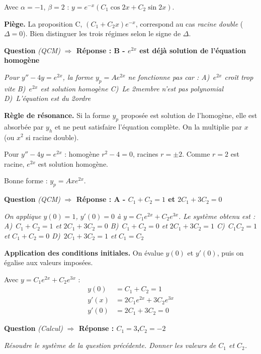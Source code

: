 \documentclass[11pt,a4paper]{article}
\newcounter{qnum}
\newcommand{\qtitre}[2]{%
  \stepcounter{qnum}%
  \medskip\noindent
  \textbf{\color{bleutexte}Question \theqnum}\enspace
  \textit{(#1)}\enspace
  \textcolor{vertok}{\textbf{$\Rightarrow$ Réponse : #2}}
  \par\smallskip
}
\newcommand{\qenonce}[1]{%
  \begin{mdframed}[backgroundcolor=grisbox, linewidth=0pt,
    innerleftmargin=8pt, innerrightmargin=8pt,
    innertopmargin=5pt, innerbottommargin=5pt,
    skipabove=2pt, skipbelow=4pt]
  \small\textit{#1}
  \end{mdframed}
}
\begin{document}
Avec $\alpha = -1$, $\beta = 2$ : $y = e^{-x}(C_1\cos 2x + C_2\sin 2x)$.

\begin{piegebox}
\textbf{Piège.} La proposition C, $(C_1 + C_2x)e^{-x}$, correspond au cas \emph{racine double} ($\Delta = 0$). Bien distinguer les trois régimes selon le signe de $\Delta$.
\end{piegebox}

\qtitre{QCM}{B - $e^{2x}$ est déjà solution de l'équation homogène}
\qenonce{Pour $y'' - 4y = e^{2x}$, la forme $y_p = Ae^{2x}$ ne fonctionne pas car :
\quad A)~$e^{2x}$ croît trop vite \quad B)~$e^{2x}$ est solution homogène \quad C)~Le 2\ieme membre n'est pas polynomial \quad D)~L'équation est du 2\ieme ordre}

\begin{methodebox}
\textbf{Règle de résonance.} Si la forme $y_p$ proposée est solution de l'homogène, elle est absorbée par $y_h$ et ne peut satisfaire l'équation complète. On la multiplie par $x$ (ou $x^2$ si racine double).
\end{methodebox}

Pour $y'' - 4y = e^{2x}$ : homogène $r^2 - 4 = 0$, racines $r = \pm 2$. Comme $r = 2$ est racine, $e^{2x}$ est solution homogène.

Bonne forme : $y_p = Axe^{2x}$.

\qtitre{QCM}{A - $C_1+C_2=1$ et $2C_1+3C_2=0$}
\qenonce{On applique $y(0)=1$, $y'(0)=0$ à $y = C_1e^{2x}+C_2e^{3x}$. Le système obtenu est :
\quad A)~$C_1+C_2=1$ et $2C_1+3C_2=0$ \quad B)~$C_1+C_2=0$ et $2C_1+3C_2=1$ \quad C)~$C_1C_2=1$ et $C_1+C_2=0$ \quad D)~$2C_1+3C_2=1$ et $C_1=C_2$}

\begin{methodebox}
\textbf{Application des conditions initiales.}
On évalue $y(0)$ et $y'(0)$, puis on égalise aux valeurs imposées.
\end{methodebox}

Avec $y = C_1e^{2x} + C_2e^{3x}$ :
\begin{align*}
y(0)  &= C_1 + C_2 = 1\\
y'(x) &= 2C_1e^{2x} + 3C_2e^{3x}\\
y'(0) &= 2C_1 + 3C_2 = 0
\end{align*}

\qtitre{Calcul}{$C_1 = 3$,\quad $C_2 = -2$}
\qenonce{Résoudre le système de la question précédente. Donner les valeurs de $C_1$ et $C_2$.}
\end{document}
